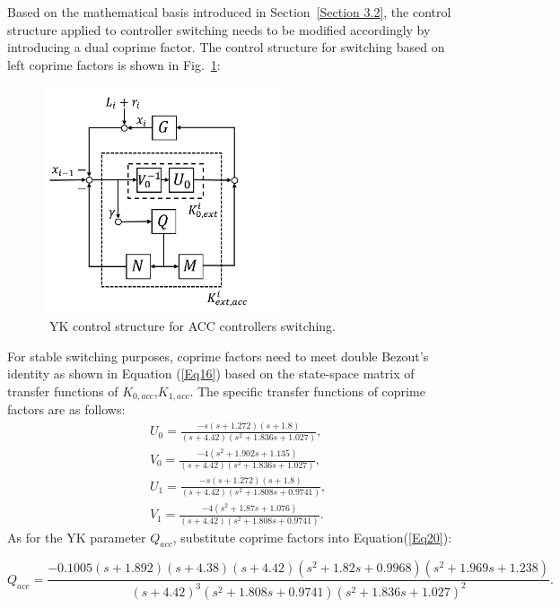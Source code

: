 \documentclass[a4paper,fleqn]{cas-sc}
\begin{document}
Based on the mathematical basis introduced in Section~\ref{Section 3.2}, the control structure applied to controller switching needs to be modified accordingly by introducing a dual coprime factor. The control structure for switching based on left coprime factors is shown in Fig.~\ref{fig6}:

\begin{figure}
  \centering
  \includegraphics[width=7cm]{figs/fig6.png}
  \caption{~YK control structure for ACC controllers switching.}
  \label{fig6}
\end{figure}
For stable switching purposes, coprime factors need to meet double Bezout's identity as shown in Equation (\ref{Eq16}) based on the state-space matrix of transfer functions of $K_{0,acc}$,$K_{1,acc}$. The specific transfer functions of coprime factors are as follows:
\begin{equation}
  \begin{aligned}
     & U_{0}=\frac{-s(s+1.272)(s+1.8)}{(s+4.42)\left(s^{2}+1.836 s+1.027\right)},                 \\
     & V_{0}=\frac{-4\left(s^{2}+1.902 s+1.135\right)}{(s+4.42)\left(s^{2}+1.836 s+1.027\right)}, \\
     & U_{1}=\frac{-s(s+1.272)(s+1.8)}{(s+4.42)\left(s^{2}+1.808 s+0.9741\right)},                \\
     & V_{1}=\frac{-4\left(s^{2}+1.87 s+1.076\right)}{(s+4.42)\left(s^{2}+1.808 s+0.9741\right)}.
  \end{aligned}
\end{equation}
As for the YK parameter $Q_{acc}$, substitute coprime factors into Equation(\ref{Eq20}):

\begin{equation}
  Q_{a c c}=\frac{-0.1005(s+1.892)(s+4.38)(s+4.42)\left(s^{2}+1.82 s+0.9968\right)\left(s^{2}+1.969 s+1.238\right)}{(s+4.42)^{3}\left(s^{2}+1.808 s+0.9741\right)\left(s^{2}+1.836 s+1.027\right)^{2}}.
\end{equation}
\end{document}
